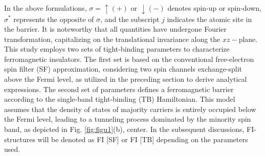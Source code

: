 \documentclass[10pt,pr,twocolumn,showpacs,amssymb,floatfix,superscriptaddress]{revtex4-1}
\begin{document}
In the above formulations, $\sigma = \uparrow (+)$ or $\downarrow (-)$ denotes spin-up or spin-down, $\sigma^*$ represents the opposite of $\sigma$, and the subscript $j$ indicates the atomic site in the barrier. It is noteworthy that all quantities have undergone Fourier transformation, capitalizing on the translational invariance along the $xz-$plane. This study employs two sets of tight-binding parameters to characterize ferromagnetic insulators. The first set is based on the conventional free-electron spin filter (SF) approximation, considering two spin channels exchange-split above the Fermi level, as utilized in the preceding section to derive analytical expressions. The second set of parameters defines a ferromagnetic barrier according to the single-band tight-binding (TB) Hamiltonian. This model assumes that the density of states of majority carriers is entirely occupied below the Fermi level, leading to a tunneling process dominated by the minority spin band, as depicted in Fig. \ref{fig:figu1}(b), center. In the subsequent discussions, FI-structures will be denoted as FI [SF] or FI [TB] depending on the parameters used. 
\end{document}
